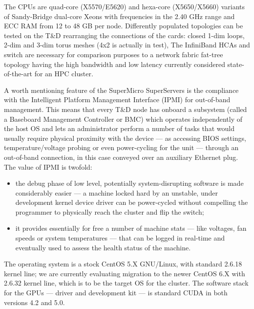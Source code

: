 The CPUs are quad-core (X5570/E5620) and hexa-core (X5650/X5660)
variants of Sandy-Bridge dual-core Xeons with frequencies in the
2.40 GHz range and ECC RAM from 12 to 48 GB per node.
Differently populated topologies can be tested on the T\&D rearranging
the connections of the \apenetp cards: closed 1-dim loops, 2-dim and
3-dim torus meshes (4x2 is actually in test), \etc
The InfiniBand HCAs and switch are necessary for comparison purposes
to a network fabric fat-tree topology having the high bandwidth and
low latency currently considered state-of-the-art for an HPC cluster.

A worth mentioning feature of the SuperMicro SuperServers is the
compliance with the Intelligent Platform Management Interface (IPMI)
for out-of-band management.
This means that every T\&D node has onboard a subsystem (called a
Baseboard Management Controller or BMC) which operates independently
of the host OS and lets an administrator perform a number of tasks
that would usually require physical proximity with the device --- as
accessing BIOS settings, temperature/voltage probing or even
power-cycling for the unit --- through an out-of-band connection, in
this case conveyed over an auxiliary Ethernet plug.
The value of IPMI is twofold:
\begin{itemize}
\item the debug phase of low level, potentially system-disrupting
  software is made considerably easier --- a machine locked hard by an
  unstable, under development kernel device driver can be power-cycled
  without compelling the programmer to physically reach the cluster
  and flip the switch;
\item it provides essentially for free a number of machine stats ---
  like voltages, fan speeds or system temperatures --- that can be
  logged in real-time and eventually used to assess the health status
  of the machine.
\end{itemize}

The operating system is a stock CentOS 5.X GNU/Linux, with standard
2.6.18 kernel line; we are currently evaluating migration to the newer
CentOS 6.X with 2.6.32 kernel line, which is to be the target OS for
the \quong cluster.
The software stack for the GPUs --- driver and development kit --- is
standard \nvidia CUDA in both versions 4.2 and 5.0.

